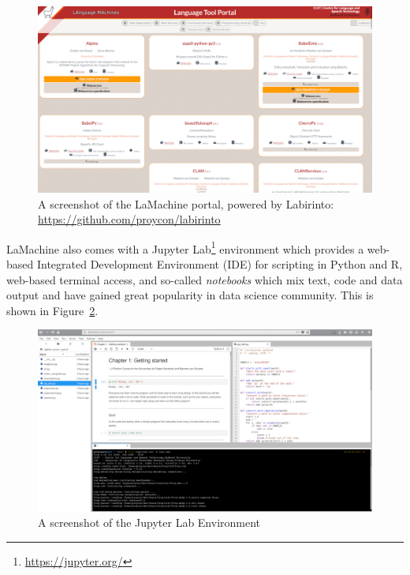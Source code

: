 \documentclass[a4paper,11pt]{article}
\begin{document}
\begin{figure}[htb] \begin{center}
\includegraphics[width=135.0mm]{screenshot_portal.jpg}
\end{center}
\caption{\footnotesize{A screenshot of the LaMachine portal, powered by Labirinto:
\url{https://github.com/proycon/labirinto}}}
\label{fig:portal}
\end{figure}


LaMachine also comes with a
Jupyter Lab\footnote{\url{https://jupyter.org/}} environment which provides a web-based Integrated Development
Environment (IDE) for scripting in Python and R, web-based terminal access, and so-called \emph{notebooks} which mix
text, code and data output and have gained great popularity in data science community. This is shown in
Figure~\ref{fig:lab}.


\begin{figure}[htb] \begin{center}
\includegraphics[width=135.0mm]{screenshot_lab.jpg}
\end{center}
\caption{\footnotesize{A screenshot of the Jupyter Lab Environment}}
\label{fig:lab}
\end{figure}
\end{document}
